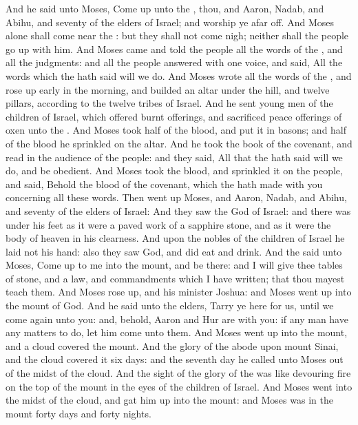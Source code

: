 \begin{biblechapter} %
 And he said unto Moses, Come up unto the \LORD, thou, and Aaron, Nadab, and Abihu, and seventy of the elders of Israel; and worship ye afar off.
\verse And Moses alone shall come near the \LORD: but they shall not come nigh; neither shall the people go up with him.
\verse And Moses came and told the people all the words of the \LORD, and all the judgments: and all the people answered with one voice, and said, All the words which the \LORD hath said will we do.
\verse And Moses wrote all the words of the \LORD, and rose up early in the morning, and builded an altar under the hill, and twelve pillars, according to the twelve tribes of Israel.
\verse And he sent young men of the children of Israel, which offered burnt offerings, and sacrificed peace offerings of oxen unto the \LORD.
\verse And Moses took half of the blood, and put it in basons; and half of the blood he sprinkled on the altar.
\verse And he took the book of the covenant, and read in the audience of the people: and they said, All that the \LORD hath said will we do, and be obedient.
\verse And Moses took the blood, and sprinkled it on the people, and said, Behold the blood of the covenant, which the \LORD hath made with you concerning all these words.
\verse Then went up Moses, and Aaron, Nadab, and Abihu, and seventy of the elders of Israel:
\verse And they saw the God of Israel: and there was under his feet as it were a paved work of a sapphire stone, and as it were the body of heaven in his clearness.
\verse And upon the nobles of the children of Israel he laid not his hand: also they saw God, and did eat and drink.
\verse And the \LORD said unto Moses, Come up to me into the mount, and be there: and I will give thee tables of stone, and a law, and commandments which I have written; that thou mayest teach them.
\verse And Moses rose up, and his minister Joshua: and Moses went up into the mount of God.
\verse And he said unto the elders, Tarry ye here for us, until we come again unto you: and, behold, Aaron and Hur are with you: if any man have any matters to do, let him come unto them.
\verse And Moses went up into the mount, and a cloud covered the mount.
\verse And the glory of the \LORD abode upon mount Sinai, and the cloud covered it six days: and the seventh day he called unto Moses out of the midst of the cloud.
\verse And the sight of the glory of the \LORD was like devouring fire on the top of the mount in the eyes of the children of Israel.
\verse And Moses went into the midst of the cloud, and gat him up into the mount: and Moses was in the mount forty days and forty nights.
\end{biblechapter}


